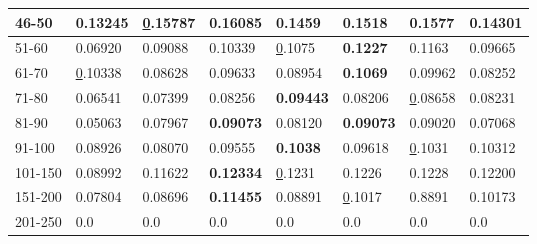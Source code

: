 \begin{table*}[]
\begin{tabular}{|l|l|l|l|l|l|l||l|}
        46-50       & 0.13245                        & {\ul 0.15787}                  & \textbf{0.16085}               & 0.1459                         & 0.1518                         & 0.1577                          & 0.14301                    \\ \hline
        51-60       & 0.06920                        & 0.09088                        & 0.10339                        & {\ul 0.1075}                   & \textbf{0.1227}                & 0.1163                          & 0.09665                    \\ \hline
        61-70       & {\ul 0.10338}                  & 0.08628                        & 0.09633                        & 0.08954                        & \textbf{0.1069}                & 0.09962                         & 0.08252                    \\ \hline
        71-80       & 0.06541                        & 0.07399                        & 0.08256                        & \textbf{0.09443}               & 0.08206                        & {\ul 0.08658}                   & 0.08231                    \\ \hline
        81-90       & 0.05063                        & 0.07967                        & \textbf{0.09073}               & 0.08120                        & \textbf{0.09073}               & 0.09020                         & 0.07068                    \\ \hline
        91-100      & 0.08926                        & 0.08070                        & 0.09555                        & \textbf{0.1038}                & 0.09618                        & {\ul 0.1031}                    & 0.10312                    \\ \hline
        101-150     & 0.08992                        & 0.11622                        & \textbf{0.12334}               & {\ul 0.1231}                   & 0.1226                         & 0.1228                          & 0.12200                    \\ \hline
        151-200     & 0.07804                        & 0.08696                        & \textbf{0.11455}               & 0.08891                        & {\ul 0.1017}                   & 0.8891                          & 0.10173                    \\ \hline
        201-250     & 0.0                            & 0.0                            & 0.0                            & 0.0                            & 0.0                            & 0.0                             & 0.0                        \\ \hline

\end{tabular}
\end{table*}
